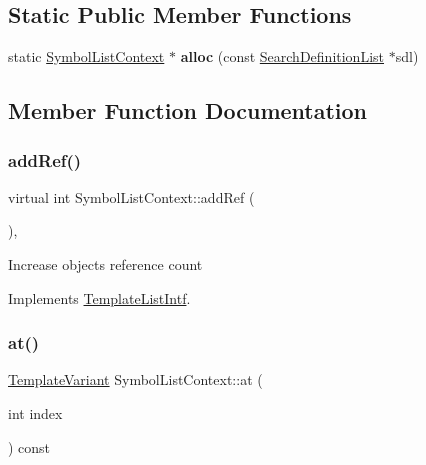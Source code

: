\subsection*{Static Public Member Functions}
\begin{DoxyCompactItemize}
\item 
\mbox{\label{class_symbol_list_context_a9745718b07f9746cf4355dc914c751c4}} 
static \mbox{\hyperlink{class_symbol_list_context}{Symbol\+List\+Context}} $\ast$ {\bfseries alloc} (const \mbox{\hyperlink{class_search_definition_list}{Search\+Definition\+List}} $\ast$sdl)
\end{DoxyCompactItemize}


\subsection{Member Function Documentation}
\mbox{\label{class_symbol_list_context_ad1f97238c59a879729d505235cd81c46}} 
\subsubsection{\texorpdfstring{addRef()}{addRef()}}
{\footnotesize\ttfamily virtual int Symbol\+List\+Context\+::add\+Ref (\begin{DoxyParamCaption}{ }\end{DoxyParamCaption})\hspace{0.3cm}{\ttfamily [inline]}, {\ttfamily [virtual]}}

Increase object\textquotesingle{}s reference count 

Implements \mbox{\hyperlink{class_template_list_intf_a4b4973e2e15396d10bc4e3085462ca2b}{Template\+List\+Intf}}.

\mbox{\label{class_symbol_list_context_ac77916a7663380ea98b505a0892a3abc}} 
\subsubsection{\texorpdfstring{at()}{at()}}
{\footnotesize\ttfamily \mbox{\hyperlink{class_template_variant}{Template\+Variant}} Symbol\+List\+Context\+::at (\begin{DoxyParamCaption}\item[{int}]{index }\end{DoxyParamCaption}) const\hspace{0.3cm}{\ttfamily [virtual]}}

